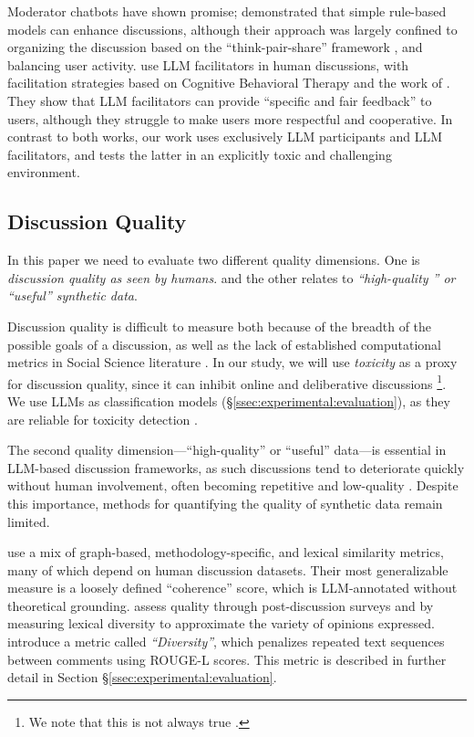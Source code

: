 Moderator chatbots have shown promise; \citet{kim_et_al_chatbot} demonstrated that simple rule-based models can enhance discussions, although their approach was largely confined to organizing the discussion based on the ``think-pair-share'' framework \cite{ahmad_2010_supporting, Navajas2018}, and balancing user activity. \citet{cho-etal-2024-language} use \ac{LLM} facilitators in human discussions, with facilitation strategies based on Cognitive Behavioral Therapy and the work of \citet{rosenberg2015nonviolent}. They show that \ac{LLM} facilitators can provide “specific and fair feedback” to users, although they struggle to make users more respectful and cooperative.  In contrast to both works, our work uses exclusively \ac{LLM} participants and \ac{LLM} facilitators, and tests the latter in an explicitly toxic and challenging environment.


\subsection{Discussion Quality}
\label{ssec:related:quality}

In this paper we need to evaluate two different quality dimensions. One is \emph{discussion quality as seen by humans}. and the other relates to \emph{``high-quality '' or ``useful'' synthetic data}.

Discussion quality is difficult to measure both because of the breadth of the possible goals of a discussion, as well as the lack of established computational metrics in Social Science literature \cite{korre2025evaluation}. In our study, we will use \emph{toxicity} as a proxy for discussion quality, since it can inhibit online and deliberative discussions \citep{dekock2022disagree, XiaToxicity}\footnote{We note that this is not always true \citep{Avalle2024PersistentIP}.}. We use \acp{LLM} as classification models (\S\ref{ssec:experimental:evaluation}), as they are reliable for toxicity detection \citep{kang-qian-2024-implanting, Wang2022ToxicityDW, anjum2024hate}.


The second quality dimension---“high-quality” or “useful” data---is essential in \ac{LLM}-based discussion frameworks, as such discussions tend to deteriorate quickly without human involvement, often becoming repetitive and low-quality \citep{ulmer2024}. Despite this importance, methods for quantifying the quality of synthetic data remain limited.

 \citet{balog_2024} use a mix of graph-based, methodology-specific, and lexical similarity metrics, many of which depend on human discussion datasets. Their most generalizable measure is a loosely defined “coherence” score, which is \ac{LLM}-annotated without theoretical grounding. \citet{kim_et_al_chatbot} assess quality through post-discussion surveys and by measuring lexical diversity to approximate the variety of opinions expressed. \citet{ulmer2024}  introduce a metric called \emph{``Diversity''}, which penalizes repeated text sequences between comments using ROUGE-L \citep{lin-2004-rouge} scores. This metric is described in further detail in Section \S\ref{ssec:experimental:evaluation}.


